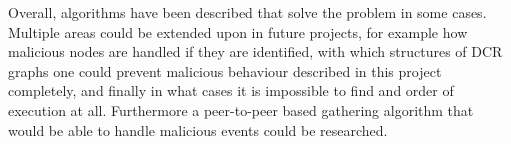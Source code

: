 \newpar Overall, algorithms have been described that solve the problem in some  cases. Multiple areas could be extended upon in future projects, for example how malicious nodes are handled if they are identified, with which structures of DCR graphs one could prevent malicious behaviour described in this project completely, and finally in what cases it is impossible to find and order of execution at all. Furthermore a peer-to-peer based gathering algorithm that would be able to handle malicious events could be researched.


